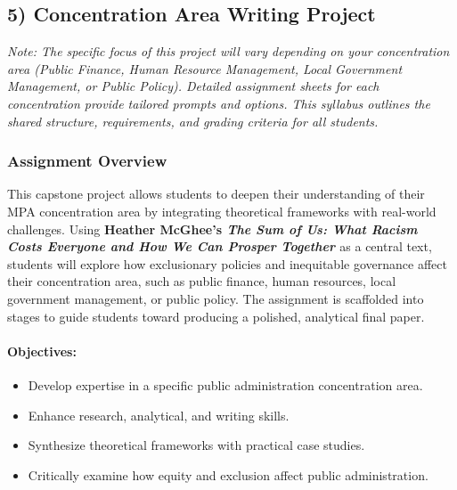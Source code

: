 \documentclass[11pt]{article}     %
\begin{document}
\subsection*{5) Concentration Area Writing Project}

\noindent \textit{Note: The specific focus of this project will vary depending on your concentration area (Public Finance, Human Resource Management, Local Government Management, or Public Policy). Detailed assignment sheets for each concentration provide tailored prompts and options. This syllabus outlines the shared structure, requirements, and grading criteria for all students.}

\subsubsection*{Assignment Overview}

This capstone project allows students to deepen their understanding of their MPA concentration area by integrating theoretical frameworks with real-world challenges. Using \textbf{Heather McGhee's \textit{The Sum of Us: What Racism Costs Everyone and How We Can Prosper Together} \citeyearpar{mcghee2021}} as a central text, students will explore how exclusionary policies and inequitable governance affect their concentration area, such as public finance, human resources, local government management, or public policy. The assignment is scaffolded into stages to guide students toward producing a polished, analytical final paper.

\paragraph*{Objectives:}
\begin{itemize}
    \item Develop expertise in a specific public administration concentration area.
    \item Enhance research, analytical, and writing skills.
    \item Synthesize theoretical frameworks with practical case studies.
    \item Critically examine how equity and exclusion affect public administration.
\end{itemize}
\end{document}
